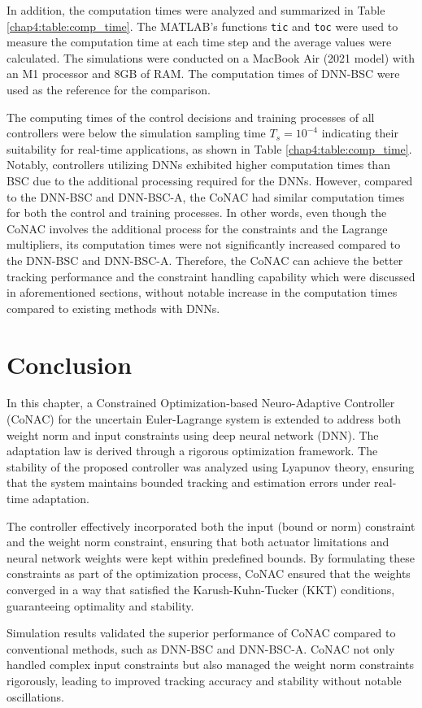 In addition, the computation times were analyzed and summarized in Table \ref{chap4:table:comp_time}.
The MATLAB's functions \texttt{tic} and \texttt{toc} were used to measure the computation time at each time step and the average values were calculated.
The simulations were conducted on a MacBook Air (2021 model) with an M1 processor and 8GB of RAM.
The computation times of DNN-BSC were used as the reference for the comparison.

The computing times of the control decisions and training processes of all controllers were below the simulation sampling time $T_s=10^{-4}$ indicating their suitability for real-time applications, as shown in Table \ref{chap4:table:comp_time}.
Notably, controllers utilizing DNNs exhibited higher computation times than BSC due to the additional processing required for the DNNs.
However, compared to the DNN-BSC and DNN-BSC-A, the CoNAC had similar computation times for both the control and training processes.
In other words, even though the CoNAC involves the additional process for the constraints and the Lagrange multipliers, its computation times were not significantly increased compared to the DNN-BSC and DNN-BSC-A.
Therefore, the CoNAC can achieve the better tracking performance and the constraint handling capability which were discussed in aforementioned sections, without notable increase in the computation times compared to existing methods with DNNs.  

\section{Conclusion} 

In this chapter, a Constrained Optimization-based Neuro-Adaptive Controller \allowbreak (CoNAC) for the uncertain Euler-Lagrange system is extended to address both weight norm and input constraints using deep neural network (DNN).
The adaptation law is derived through a rigorous optimization framework. 
The stability of the proposed controller was analyzed using Lyapunov theory, ensuring that the system maintains bounded tracking and estimation errors under real-time adaptation.

The controller effectively incorporated both the input (bound or norm) constraint and the weight norm constraint, ensuring that both actuator limitations and neural network weights were kept within predefined bounds. 
By formulating these constraints as part of the optimization process, CoNAC ensured that the weights converged in a way that satisfied the Karush-Kuhn-Tucker (KKT) conditions, guaranteeing optimality and stability.

Simulation results validated the superior performance of CoNAC compared to conventional methods, such as DNN-BSC and DNN-BSC-A. 
CoNAC not only handled complex input constraints but also managed the weight norm constraints rigorously, leading to improved tracking accuracy and stability without notable oscillations.
